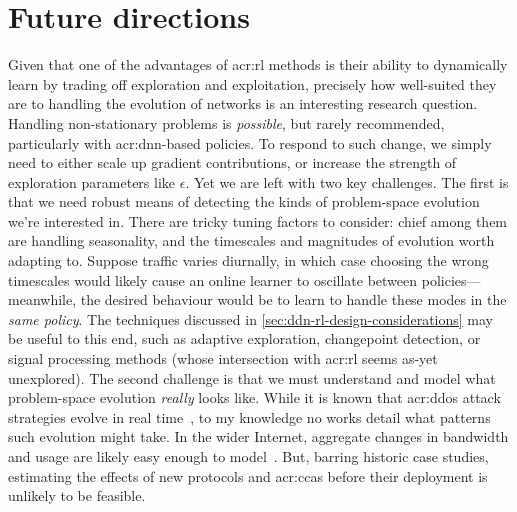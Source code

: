 \section{Future directions}



Given that one of the advantages of \gls{acr:rl} methods is their ability to dynamically learn by trading off exploration and exploitation, precisely how well-suited they are to handling the evolution of networks is an interesting research question.
Handling non-stationary problems is \emph{possible}, but rarely recommended, particularly with \gls{acr:dnn}-based policies.
To respond to such change, we simply need to either scale up gradient contributions, or increase the strength of exploration parameters like $\epsilon$.
Yet we are left with two key challenges.
The first is that we need robust means of detecting the kinds of problem-space evolution we're interested in.
There are tricky tuning factors to consider: chief among them are handling seasonality, and the timescales and magnitudes of evolution worth adapting to.
Suppose traffic varies diurnally, in which case choosing the wrong timescales would likely cause an online learner to oscillate between policies---meanwhile, the desired behaviour would be to learn to handle these modes in the \emph{same policy}.
The techniques discussed in \cref{sec:ddn-rl-design-considerations} may be useful to this end, such as adaptive exploration, changepoint detection, or signal processing methods (whose intersection with \gls{acr:rl} seems as-yet unexplored).
The second challenge is that we must understand and model what problem-space evolution \emph{really} looks like.
While it is known that \gls{acr:ddos} attack strategies evolve in real time~\parencite{DBLP:conf/spw/KangGS16}, to my knowledge no works detail what patterns such evolution might take.
In the wider Internet, aggregate changes in bandwidth and usage are likely easy enough to model~\parencite{DBLP:conf/anrw/BauerJHBC21}.
But, barring historic case studies, estimating the effects of new protocols and \glspl{acr:cca} before their deployment is unlikely to be feasible.

